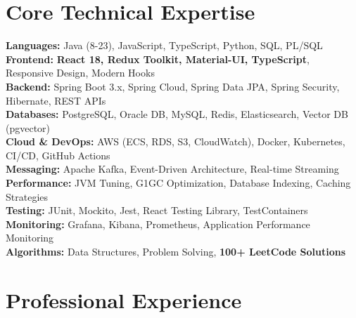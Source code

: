 \documentclass[a4paper,10pt]{article}
\begin{document}
\section*{Core Technical Expertise}
\vspace{-4pt}
\textbf{Languages:} Java (8-23), JavaScript, TypeScript, Python, SQL, PL/SQL \\
\textbf{Frontend:} \textbf{React 18, Redux Toolkit, Material-UI, TypeScript}, Responsive Design, Modern Hooks \\
\textbf{Backend:} Spring Boot 3.x, Spring Cloud, Spring Data JPA, Spring Security, Hibernate, REST APIs \\
\textbf{Databases:} PostgreSQL, Oracle DB, MySQL, Redis, Elasticsearch, Vector DB (pgvector) \\
\textbf{Cloud \& DevOps:} AWS (ECS, RDS, S3, CloudWatch), Docker, Kubernetes, CI/CD, GitHub Actions \\
\textbf{Messaging:} Apache Kafka, Event-Driven Architecture, Real-time Streaming \\
\textbf{Performance:} JVM Tuning, G1GC Optimization, Database Indexing, Caching Strategies \\
\textbf{Testing:} JUnit, Mockito, Jest, React Testing Library, TestContainers \\
\textbf{Monitoring:} Grafana, Kibana, Prometheus, Application Performance Monitoring \\
\textbf{Algorithms:} Data Structures, Problem Solving, \textbf{100+ LeetCode Solutions}

\vspace{-2pt}

\section*{Professional Experience}
\vspace{-4pt}
\end{document}
